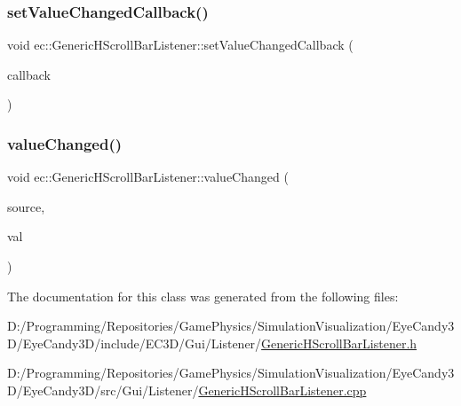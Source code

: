 \mbox{\label{classec_1_1_generic_h_scroll_bar_listener_a6b33c23b467c4a006acca5e134fc9f12}} 
\subsubsection{\texorpdfstring{set\+Value\+Changed\+Callback()}{setValueChangedCallback()}}
{\footnotesize\ttfamily void ec\+::\+Generic\+H\+Scroll\+Bar\+Listener\+::set\+Value\+Changed\+Callback (\begin{DoxyParamCaption}\item[{const \mbox{\hyperlink{classec_1_1_generic_h_scroll_bar_listener_ad02a375c4835a99a41bcd97b6a408637}{Value\+Changed\+\_\+\+Callback}} \&}]{callback }\end{DoxyParamCaption})}

\mbox{\label{classec_1_1_generic_h_scroll_bar_listener_a7c55d42a9623801361988a153d5d2d6d}} 
\subsubsection{\texorpdfstring{value\+Changed()}{valueChanged()}}
{\footnotesize\ttfamily void ec\+::\+Generic\+H\+Scroll\+Bar\+Listener\+::value\+Changed (\begin{DoxyParamCaption}\item[{agui\+::\+H\+Scroll\+Bar $\ast$}]{source,  }\item[{int}]{val }\end{DoxyParamCaption})\hspace{0.3cm}{\ttfamily [override]}}



The documentation for this class was generated from the following files\+:\begin{DoxyCompactItemize}
\item 
D\+:/\+Programming/\+Repositories/\+Game\+Physics/\+Simulation\+Visualization/\+Eye\+Candy3\+D/\+Eye\+Candy3\+D/include/\+E\+C3\+D/\+Gui/\+Listener/\mbox{\hyperlink{_generic_h_scroll_bar_listener_8h}{Generic\+H\+Scroll\+Bar\+Listener.\+h}}\item 
D\+:/\+Programming/\+Repositories/\+Game\+Physics/\+Simulation\+Visualization/\+Eye\+Candy3\+D/\+Eye\+Candy3\+D/src/\+Gui/\+Listener/\mbox{\hyperlink{_generic_h_scroll_bar_listener_8cpp}{Generic\+H\+Scroll\+Bar\+Listener.\+cpp}}\end{DoxyCompactItemize}
